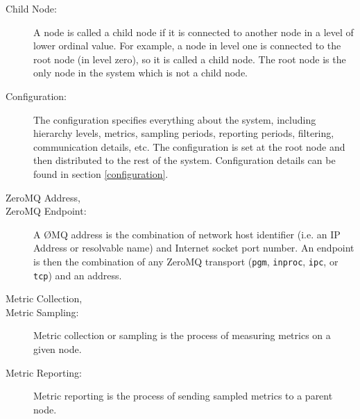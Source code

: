 \begin{description}
\item[Child Node:]
A node is called a child node if it is connected to another node in a level of lower ordinal value. For example, a node
in level one is connected to the root node (in level zero), so it is called a child node. The root node is the only
node in the \dcamp system which is not a child node. 

\item[\dcamp Configuration:]
The \dcamp configuration specifies everything about the system, including hierarchy levels, metrics, sampling periods,
reporting periods, filtering, communication details, etc. The configuration is set at the root node and then
distributed to the rest of the \dcamp system. Configuration details can be found in section \ref{configuration}. 

\item[ZeroMQ Address,]
\item[ZeroMQ Endpoint:]
A \O MQ address is the combination of network host identifier (i.e. an IP Address or resolvable name) and Internet
socket port number. An endpoint is then the combination of any ZeroMQ transport (\texttt{pgm}, \texttt{inproc},
\texttt{ipc}, or \texttt{tcp}) and an address.

\item[Metric Collection,]
\item[Metric Sampling:]
Metric collection or sampling is the process of measuring metrics on a given node. 

\item[Metric Reporting:]
Metric reporting is the process of sending sampled metrics to a parent node.

\end{description}

